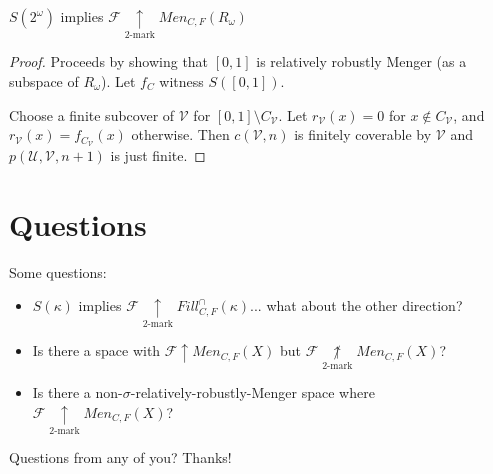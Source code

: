 \documentclass{beamer}
\theoremstyle{definition}
\newcommand{\win}{\uparrow}
\newcommand{\kmarkwin}[1]{\underset{#1\text{-mark}}{\uparrow}}
\newcommand{\notkmarkwin}[1]{\underset{#1\text{-mark}}{\not\uparrow}}
\newcommand{\mengame}[1]{Men_{C,F}(#1)}
\newcommand{\fillgameInt}[1]{Fill^{\cap}_{C,F}(#1)}
\newcommand{\<}{\langle}
\renewcommand{\>}{\rangle}
\newcommand{\mc}[1]{\mathcal{#1}}
\newcommand{\alcompS}[1]{S(#1)}
\newcommand{\pl}[1]{\mathscr{#1}}
\begin{document}
\begin{frame}
  \begin{theorem}
    $\alcompS{2^\omega}$ implies $\pl F\kmarkwin2\mengame{R_\omega}$
  \end{theorem}

  \begin{proof}
    Proceeds by showing that $[0,1]$ is relatively robustly Menger (as
    a subspace of $R_\omega$). Let $f_C$ witness $\alcompS{[0,1]}$.

    \vpause

    Choose a finite subcover of $\mc V$ for $[0,1]\setminus C_{\mc V}$.
    Let $r_{\mc V}(x)=0$ for $x\not\in C_{\mc V}$, and
    $r_{\mc V}(x)= f_{C_{\mc V}}(x)$ otherwise. Then $c(\mc V,n)$ is
    finitely coverable by $\mc V$ and $p(\mc U,\mc V,n+1)$ is just finite.
  \end{proof}
\end{frame}

\section{Questions}

\begin{frame}
  Some questions:

  \begin{itemize}
    \item $\alcompS\kappa$ implies $\pl F\kmarkwin2\fillgameInt\kappa$...
    what about the other direction?
    \item Is there a space with $\pl F\win\mengame{X}$ but
    $\pl F\notkmarkwin2\mengame{X}$?
    \item Is there a non-$\sigma$-relatively-robustly-Menger space where
    $\pl F\kmarkwin2\mengame{X}$?
  \end{itemize}
\end{frame}

\begin{frame}
  Questions from any of you? Thanks!
\end{frame}
\end{document}
